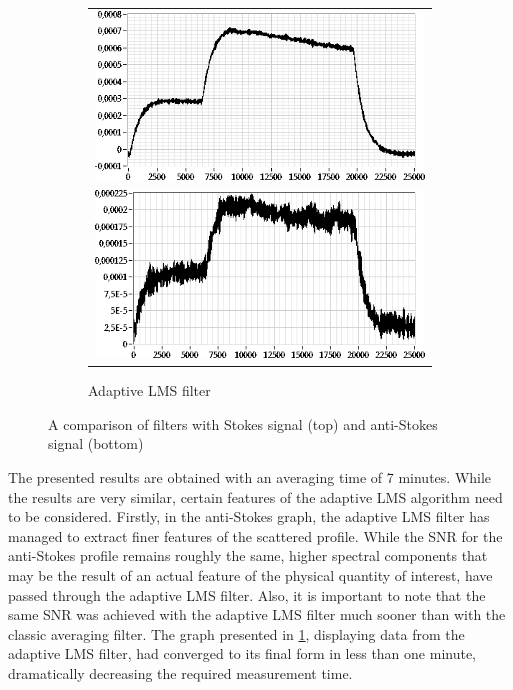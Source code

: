\documentclass{standalone}
\begin{document}
\begin{figure}[h]
\begin{subfigure}[b]{0.49\textwidth}
		\begin{tabular}{c}
			\includegraphics[width=\textwidth]{classic_lms_compare_stokes_lms.png} \\
			\includegraphics[width=\textwidth]{classic_lms_compare_antistokes_lms.png}
		\end{tabular}
		\caption{Adaptive LMS filter}
	\end{subfigure}
	\caption{A comparison of filters with Stokes signal (top) and anti-Stokes signal (bottom)}
	\label{fig:classic_lms_compare}
\end{figure}
The presented results are obtained with an averaging time of 7 minutes. While the results are very similar, certain features of the adaptive LMS algorithm need to be considered. Firstly, in the anti-Stokes graph, the adaptive LMS filter has managed to extract finer features of the scattered profile. While the SNR for the anti-Stokes profile remains roughly the same, higher spectral components that may be the result of an actual feature of the physical quantity of interest, have passed through the adaptive LMS filter. Also, it is important to note that the same SNR was achieved with the adaptive LMS filter much sooner than with the classic averaging filter. The graph presented in \ref{fig:classic_lms_compare}, displaying data from the adaptive LMS filter, had converged to its final form in less than one minute, dramatically decreasing the required measurement time. \\
\end{document}
